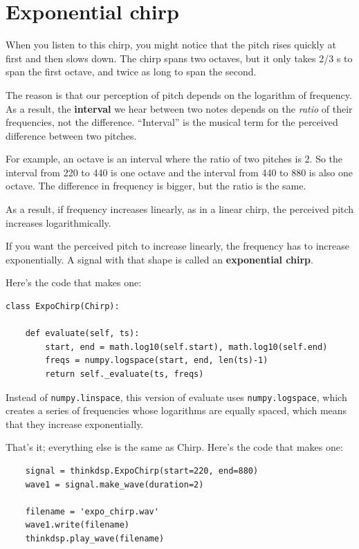 \documentclass[12pt]{book}
\begin{document}
\section{Exponential chirp}

When you listen to this chirp, you might notice that the pitch
rises quickly at first and then slows down.
The chirp spans two octaves, but it only takes 2/3 s to span
the first octave, and twice as long to span the second.  

The reason is that our perception of pitch depends on the
logarithm of frequency.  As a result, the {\bf interval} we hear between
two notes depends on the {\em ratio} of their frequencies, not
the difference.  ``Interval'' is the musical term for the
perceived difference between two pitches.

For example, an octave is an interval where the ratio of two
pitches is 2.  So the interval from 220 to 440 is one octave
and the interval from 440 to 880 is also one octave.  The difference
in frequency is bigger, but the ratio is the same.

As a result, if frequency increases linearly, as in a linear
chirp, the perceived pitch increases logarithmically.

If you want the perceived pitch to increase linearly, the frequency
has to increase exponentially.  A signal with that shape is called
an {\bf exponential chirp}.

Here's the code that makes one:

\begin{verbatim}
class ExpoChirp(Chirp):
    
    def evaluate(self, ts):
        start, end = math.log10(self.start), math.log10(self.end)
        freqs = numpy.logspace(start, end, len(ts)-1)
        return self._evaluate(ts, freqs)
\end{verbatim}

Instead of {\tt numpy.linspace}, this version of evaluate uses
{\tt numpy.logspace}, which creates a series of frequencies
whose logarithms are equally spaced, which means that they increase
exponentially.

That's it; everything else is the same as Chirp.  Here's the code
that makes one:

\begin{verbatim}
    signal = thinkdsp.ExpoChirp(start=220, end=880)
    wave1 = signal.make_wave(duration=2)

    filename = 'expo_chirp.wav'
    wave1.write(filename)
    thinkdsp.play_wave(filename)
\end{verbatim}
\end{document}
